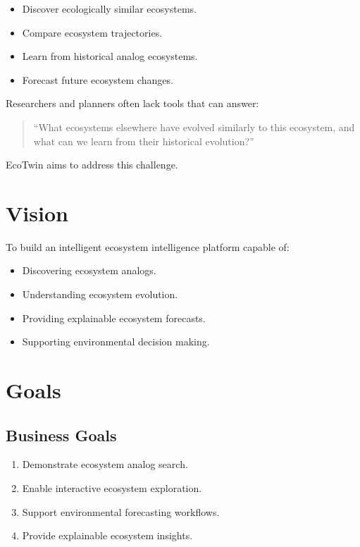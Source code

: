 \documentclass[11pt,a4paper]{article}
\begin{document}
\begin{itemize}
\item Discover ecologically similar ecosystems.
\item Compare ecosystem trajectories.
\item Learn from historical analog ecosystems.
\item Forecast future ecosystem changes.
\end{itemize}

Researchers and planners often lack tools that can answer:

\begin{quote}
``What ecosystems elsewhere have evolved similarly to this ecosystem, and what can we learn from their historical evolution?''
\end{quote}

EcoTwin aims to address this challenge.

\section{Vision}

To build an intelligent ecosystem intelligence platform capable of:

\begin{itemize}
\item Discovering ecosystem analogs.
\item Understanding ecosystem evolution.
\item Providing explainable ecosystem forecasts.
\item Supporting environmental decision making.
\end{itemize}

\section{Goals}

\subsection{Business Goals}

\begin{enumerate}
\item Demonstrate ecosystem analog search.
\item Enable interactive ecosystem exploration.
\item Support environmental forecasting workflows.
\item Provide explainable ecosystem insights.
\end{enumerate}
\end{document}
